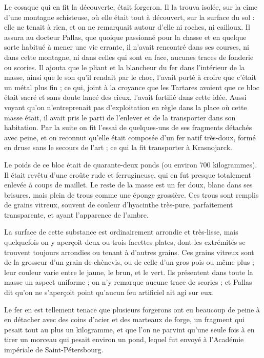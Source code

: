 \documentclass[a4paper, 12pt, oneside, french]{article}
\begin{document}
Le cosaque qui en fit la découverte, était forgeron. Il la trouva isolée, sur la cime d'une montagne schisteuse, où elle était tout à découvert, sur la surface du sol : elle ne tenait à rien, et on ne remarquait autour d'elle ni roches, ni cailloux. Il assura au docteur Pallas, que quoique passionné pour la chasse et en quelque sorte habitué à mener une vie errante, il n'avait rencontré dans ses courses, ni dans cette montagne, ni dans celles qui sont en face, aucunes traces de fonderie ou scories. Il ajouta que le pliant et la blancheur du fer dans l'intérieur de la masse, ainsi que le son qu'il rendait par le choc, l'avait porté à croire que c'était un métal plus fin ; ce qui, joint à la croyance que les Tartares avoient que ce bloc était sacré et sans doute lancé des cieux, l'avait fortifié dans cette idée. Aussi voyant qu'on n'entreprenait pas d'exploitation en règle dans la place où cette masse était, il avait pris le parti de l'enlever et de la transporter dans son habitation. Par la suite on fit l'essai de quelques-uns de ses fragments détachés avec peine, et on reconnut qu'elle était composée d'un fer natif très-doux, formé en druse sans le secours de l'art ; ce qui la fit transporter à Krasnojarck.

Le poids de ce bloc était de quarante-deux ponds (ou environ 700 kilogrammes). Il était revêtu d'une croûte rude et ferrugineuse, qui en fut presque totalement enlevée à coups de maillet. Le reste de la masse est un fer doux, blanc dans ses brisures, mais plein de trous comme une éponge grossière. Ces trous sont remplis de grains vitreux, souvent de couleur d'hyacinthe très-pure, parfaitement transparente, et ayant l'apparence de l'ambre.

La surface de cette substance est ordinairement arrondie et très-lisse, mais quelquefois on y aperçoit deux ou trois facettes plates, dont les extrémités se trouvent toujours arrondies ou tenant à d'autres grains. Ces grains vitreux sont de la grosseur d'un grain de chènevis, ou de celle d'un gros pois ou même plus ; leur couleur varie entre le jaune, le brun, et le vert. Ils présentent dans toute la masse un aspect uniforme ; on n'y remarque aucune trace de scories ; et Pallas dit qu'on ne s'aperçoit point qu'aucun feu artificiel ait agi sur eux.

Le fer en est tellement tenace que plusieurs forgerons ont eu beaucoup de peine à en détacher avec des coins d'acier et des marteaux de forge, un fragment qui pesait tout au plus un kilogramme, et que l'on ne parvint qu'une seule fois à en tirer un morceau qui pesait environ un pond, lequel fut envoyé à l'Académie impériale de Saint-Pétersbourg.
\end{document}
